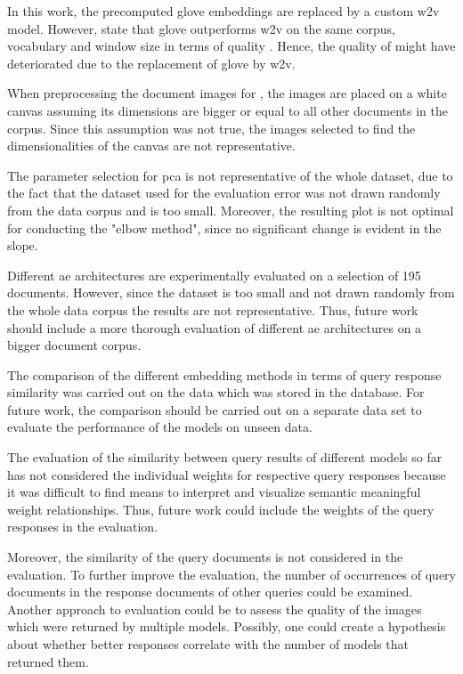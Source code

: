 In this work, the precomputed \ac{glove} embeddings are replaced by a custom \ac{w2v} model.
However, \citeauthor{glove2014} state that \acs{glove} outperforms \ac{w2v} on the same corpus, 
vocabulary and window size in terms of quality \cite{glove2014}.
Hence, the quality of \infersent{} might have deteriorated due to the replacement of \ac{glove} by \ac{w2v}.

When preprocessing the document images for \eigendocs{}, the images are placed on a white canvas assuming 
its dimensions are bigger or equal to all other documents in the corpus.
Since this assumption was not true, the images selected to find the dimensionalities of the canvas are not representative.

The parameter selection for \ac{pca} is not representative of the whole dataset, 
due to the fact that the dataset used for the evaluation error was not drawn randomly from the data corpus and is too small.
Moreover, the resulting plot is not optimal for conducting the "elbow method", since no significant change is evident in the slope.


Different \ac{ae} architectures are experimentally evaluated on a selection of 195 documents.
However, since the dataset is too small and not drawn randomly from the whole data corpus the results are not representative.
Thus, future work should include a more thorough evaluation of different \ac{ae} architectures on a bigger document corpus.

The comparison of the different embedding methods in terms of query response similarity was carried out on the data which was stored in the database.
For future work, the comparison should be carried out on a separate data set to evaluate the performance of the models on unseen data.

The evaluation of the similarity between query results of different models so far 
has not considered the individual weights for respective query responses
because it was difficult to find means 
to interpret and visualize semantic meaningful weight relationships.
Thus, future work could include the weights of the query responses in the evaluation.

Moreover, the similarity of the query documents is not considered in the evaluation.
To further improve the evaluation, the number of occurrences of query documents in the response documents of other queries could be examined.
Another approach to evaluation could be to assess the quality of the images which were returned by multiple models.
Possibly, one could create a hypothesis about whether better responses correlate with the number of models that returned them.

